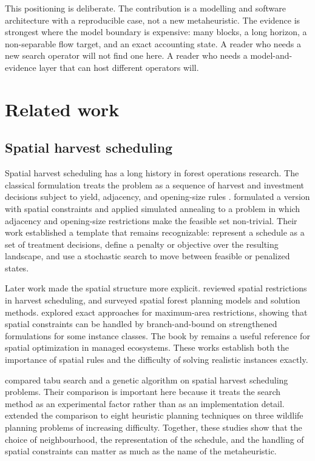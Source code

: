 \documentclass[preprint,11pt]{elsarticle}
\begin{document}
This positioning is deliberate. The contribution is a modelling and software
architecture with a reproducible case, not a new metaheuristic. The evidence is strongest where the
model boundary is expensive: many blocks, a long horizon, a non-separable flow target, and an exact
accounting state. A reader who needs a new search operator will not find one here. A reader who needs
a model-and-evidence layer that can host different operators will.

\section{Related work}\label{related-work}

\subsection{Spatial harvest scheduling}\label{spatial-harvest-scheduling}

Spatial harvest scheduling has a long history in forest operations research. The classical formulation
treats the problem as a sequence of harvest and investment decisions subject to yield, adjacency, and
opening-size rules \citep{johnson1977,davis2001}. \citet{lockwood1993} formulated a version with
spatial constraints and applied simulated annealing to a problem in which adjacency and opening-size
restrictions make the feasible set non-trivial. Their work established a template that remains
recognizable: represent a schedule as a set of treatment decisions, define a penalty or objective over
the resulting landscape, and use a stochastic search to move between feasible or penalized states.

Later work made the spatial structure more explicit. \citet{murray1999} reviewed spatial restrictions
in harvest scheduling, and \citet{baskent2005} surveyed spatial forest planning models and
solution methods. \citet{goycoolea2005} explored exact approaches for maximum-area restrictions,
showing that spatial constraints can be handled by branch-and-bound on strengthened formulations for
some instance classes. The book by \citet{hof1998} remains a useful reference for spatial
optimization in managed ecosystems. These works establish both the importance of spatial rules and the
difficulty of solving realistic instances exactly.

\citet{boston2002} compared tabu search and a genetic algorithm on spatial harvest scheduling
problems. Their comparison is important here because it treats the search method as an experimental
factor rather than as an implementation detail. \citet{bettinger2002} extended the comparison to
eight heuristic planning techniques on three wildlife planning problems of increasing difficulty.
Together, these studies show that the choice of neighbourhood, the representation of the schedule, and
the handling of spatial constraints can matter as much as the name of the metaheuristic.
\end{document}
